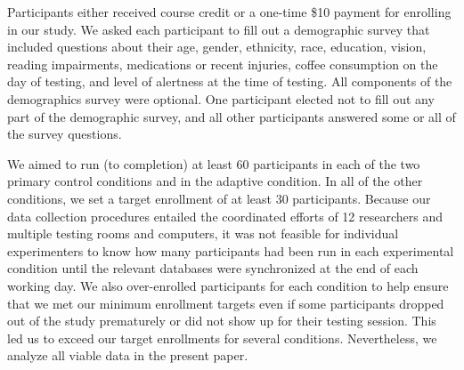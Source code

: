 \documentclass[11pt]{article}
\begin{document}
Participants either received course credit or a one-time \$10 payment for
enrolling in our study. We asked each participant to fill out a demographic
survey that included questions about their age, gender, ethnicity, race,
education, vision, reading impairments, medications or recent injuries, coffee
consumption on the day of testing, and level of alertness at the time of
testing. All components of the demographics survey were optional. One
participant elected not to fill out any part of the demographic survey, and all
other participants answered some or all of the survey questions.

We aimed to run (to completion) at least 60 participants in each of the two
primary control conditions and in the adaptive condition. In all of the other
conditions, we set a target enrollment of at least 30 participants. Because our
data collection procedures entailed the coordinated efforts of 12 researchers
and multiple testing rooms and computers, it was not feasible for individual
experimenters to know how many participants had been run in each experimental
condition until the relevant databases were synchronized at the end of each
working day. We also over-enrolled participants for each condition to help
ensure that we met our minimum enrollment targets even if some participants
dropped out of the study prematurely or did not show up for their testing
session. This led us to exceed our target enrollments for several conditions.
Nevertheless, we analyze all viable data in the present paper.
\end{document}
